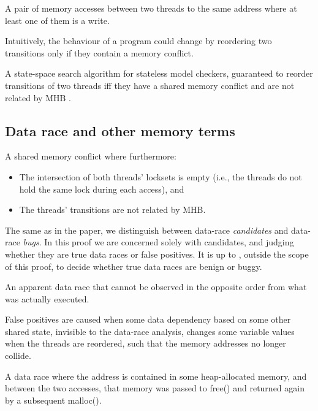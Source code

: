 \begin{definition}
A pair of memory accesses between two threads to the same address where at least one of them is a write.
\end{definition}
Intuitively, the behaviour of a program could change by reordering two transitions only if they contain a memory conflict.

\begin{definition}
	A state-space search algorithm for stateless model checkers,
	guaranteed to reorder transitions of two threads
	iff they have a shared memory conflict and are not related by MHB \cite{dpor}.
	\label{def:dpor}
\end{definition}

\subsection{Data race and other memory terms}

\begin{definition}
A shared memory conflict where furthermore:
\begin{itemize}
	\item The intersection of both threads' locksets is empty (i.e., the threads do not hold the same lock during each access), and
	\item The threads' transitions are not related by MHB.
\end{itemize}
\end{definition}

The same as in the paper, we distinguish between data-race {\em candidates} and data-race {\em bugs}.
In this proof we are concerned solely with candidates, and judging whether they are true data races or false positives.
It is up to \quicksand, outside the scope of this proof, to decide whether true data races are benign or buggy.

\begin{definition}
	An apparent data race that cannot be observed in the opposite order from what was actually executed.
\end{definition}

False positives are caused when some data dependency based on some other shared state, invisible to the data-race analysis,
changes some variable values when the threads are reordered, such that the memory addresses no longer collide.

\begin{definition}
	A data race where the address is contained in some heap-allocated memory, and between the two accesses, that memory was passed to free() and returned again by a subsequent malloc().
\end{definition}

